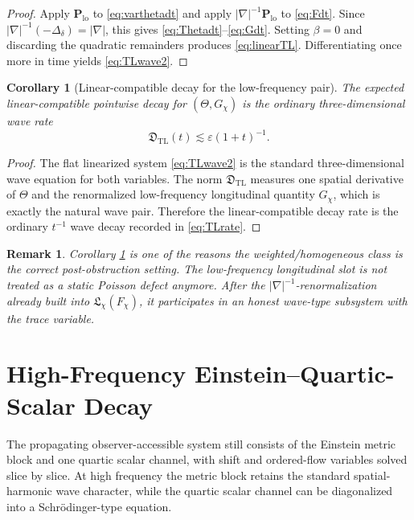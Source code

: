\documentclass[11pt]{article}
\newtheorem{remark}{Remark}
\newtheorem{corollary}{Corollary}
\begin{document}
\begin{proof}
Apply \(\mathbf P_{\mathrm{lo}}\) to \eqref{eq:varthetadt} and apply \(|\nabla|^{-1}\mathbf P_{\mathrm{lo}}\) to \eqref{eq:Fdt}. Since \(|\nabla|^{-1}(-\Delta_\delta)=|\nabla|\), this gives \eqref{eq:Thetadt}--\eqref{eq:Gdt}. Setting \(\beta=0\) and discarding the quadratic remainders produces \eqref{eq:linearTL}. Differentiating once more in time yields \eqref{eq:TLwave2}.
\end{proof}

\begin{corollary}[Linear-compatible decay for the low-frequency pair]
\label{cor:TLdecay}
The expected linear-compatible pointwise decay for \((\Theta,G_\chi)\) is the ordinary three-dimensional wave rate
\begin{equation}
\mathfrak D_{\mathrm{TL}}(t)\lesssim \varepsilon(1+t)^{-1}.
\label{eq:TLrate}
\end{equation}
\end{corollary}

\begin{proof}
The flat linearized system \eqref{eq:TLwave2} is the standard three-dimensional wave equation for both variables. The norm \(\mathfrak D_{\mathrm{TL}}\) measures one spatial derivative of \(\Theta\) and the renormalized low-frequency longitudinal quantity \(G_\chi\), which is exactly the natural wave pair. Therefore the linear-compatible decay rate is the ordinary \(t^{-1}\) wave decay recorded in \eqref{eq:TLrate}.
\end{proof}

\begin{remark}
Corollary \ref{cor:TLdecay} is one of the reasons the weighted/homogeneous class is the correct post-obstruction setting. The low-frequency longitudinal slot is not treated as a static Poisson defect anymore. After the \(|\nabla|^{-1}\)-renormalization already built into \(\mathfrak L_\chi(F_\chi)\), it participates in an honest wave-type subsystem with the trace variable.
\end{remark}

\section{High-Frequency Einstein--Quartic-Scalar Decay}

The propagating observer-accessible system still consists of the Einstein metric block and one quartic scalar channel, with shift and ordered-flow variables solved slice by slice. At high frequency the metric block retains the standard spatial-harmonic wave character, while the quartic scalar channel can be diagonalized into a Schr\"odinger-type equation.
\end{document}

